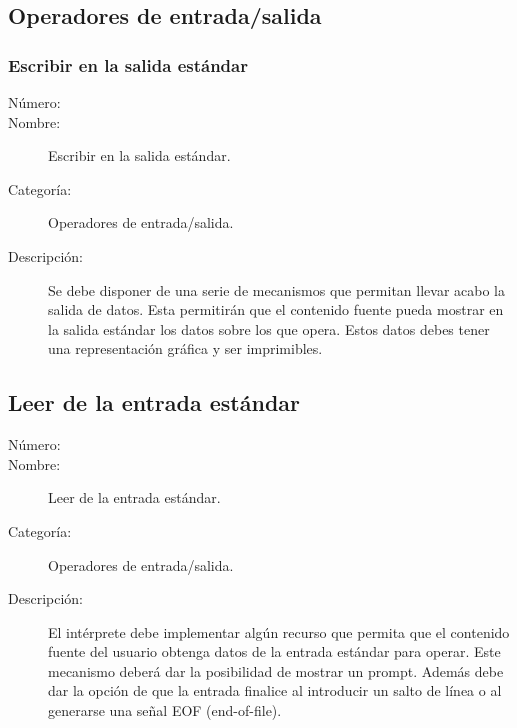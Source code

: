 \subsection{Operadores de entrada/salida}

\subsubsection{Escribir en la salida estándar}
	\begin{description}
		\item [Número:] \cn
		\item [Nombre:] Escribir en la salida estándar.
		\item [Categoría:] Operadores de entrada/salida.
		\item [Descripción:] Se debe disponer de una serie de mecanismos que permitan llevar acabo la salida de datos. Esta permitirán que el contenido fuente pueda mostrar en la salida estándar los datos sobre los que opera. Estos datos
		debes tener una representación gráfica y ser imprimibles.  
	\end {description}

\subsection{Leer de la entrada estándar}
	\begin{description}
		\item [Número:] \cn
		\item [Nombre:] Leer de la entrada estándar.
		\item [Categoría:] Operadores de entrada/salida.
		\item [Descripción:] El intérprete debe implementar algún recurso que permita que el contenido fuente del usuario
		obtenga datos de la entrada estándar para operar. Este mecanismo deberá dar la posibilidad de mostrar un prompt.
		Además debe dar la opción de que la entrada finalice al introducir un salto de línea o al generarse una señal EOF (end-of-file).
	\end {description}

